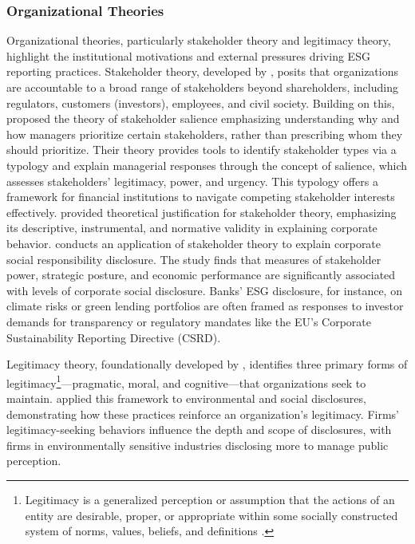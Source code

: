 \documentclass[
  authoryear]{elsarticle}
\begin{document}
\subsubsection{Organizational Theories}\label{organizational-theories}

Organizational theories, particularly stakeholder theory and legitimacy
theory, highlight the institutional motivations and external pressures
driving ESG reporting practices. Stakeholder theory, developed by
\citet{FREEMAN1984}, posits that organizations are accountable to a
broad range of stakeholders beyond shareholders, including regulators,
customers (investors), employees, and civil society. Building on this,
\citet{MITCHELL1997} proposed the theory of stakeholder salience
emphasizing understanding why and how managers prioritize certain
stakeholders, rather than prescribing whom they should prioritize. Their
theory provides tools to identify stakeholder types via a typology and
explain managerial responses through the concept of salience, which
assesses stakeholders' legitimacy, power, and urgency. This typology
offers a framework for financial institutions to navigate competing
stakeholder interests effectively. \citet{DONALDSON1995} provided
theoretical justification for stakeholder theory, emphasizing its
descriptive, instrumental, and normative validity in explaining
corporate behavior. \citet{ROBERTS1992} conducts an application of
stakeholder theory to explain corporate social responsibility
disclosure. The study finds that measures of stakeholder power,
strategic posture, and economic performance are significantly associated
with levels of corporate social disclosure. Banks' ESG disclosure, for
instance, on climate risks or green lending portfolios are often framed
as responses to investor demands for transparency or regulatory mandates
like the EU's Corporate Sustainability Reporting Directive (CSRD).

Legitimacy theory, foundationally developed by \citet{SUCHMAN1995},
identifies three primary forms of legitimacy\footnote{Legitimacy is a
  generalized perception or assumption that the actions of an entity are
  desirable, proper, or appropriate within some socially constructed
  system of norms, values, beliefs, and definitions
  \citep{GINZEL2004, NEILSEN1987, PERROW1970}.}---pragmatic, moral, and
cognitive---that organizations seek to maintain. \citet{DEEGAN2002}
applied this framework to environmental and social disclosures,
demonstrating how these practices reinforce an organization's
legitimacy. Firms' legitimacy-seeking behaviors influence the depth and
scope of disclosures, with firms in environmentally sensitive industries
disclosing more to manage public perception.
\end{document}
